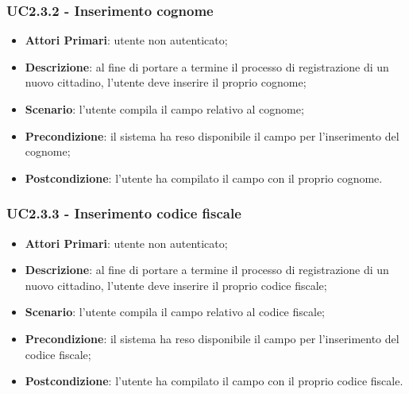 \subsubsection{UC2.3.2 - Inserimento cognome}
\begin{itemize}
	\item \textbf{Attori Primari}: utente non autenticato;
	\item \textbf{Descrizione}: al fine di portare a termine il processo di registrazione di un nuovo cittadino, l'utente deve inserire il proprio cognome;
	\item \textbf{Scenario}: l'utente compila il campo relativo al cognome;
	\item \textbf{Precondizione}: il sistema ha reso disponibile il campo per l'inserimento del cognome;
	\item \textbf{Postcondizione}: l'utente ha compilato il campo con il proprio cognome.
\end{itemize}
\subsubsection{UC2.3.3 - Inserimento codice fiscale}
\begin{itemize}
	\item \textbf{Attori Primari}: utente non autenticato;
	\item \textbf{Descrizione}: al fine di portare a termine il processo di registrazione di un nuovo cittadino, l'utente deve inserire il proprio codice fiscale;
	\item \textbf{Scenario}: l'utente compila il campo relativo al codice fiscale;
	\item \textbf{Precondizione}: il sistema ha reso disponibile il campo per l'inserimento del codice fiscale;
	\item \textbf{Postcondizione}: l'utente ha compilato il campo con il proprio codice fiscale.
\end{itemize}
